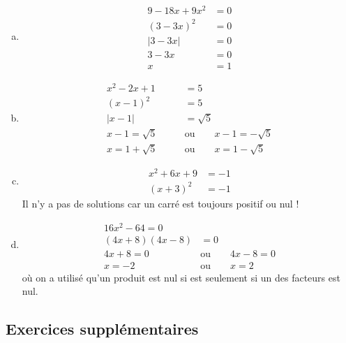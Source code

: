 {\begin{enumerate}[a)]
			\item
			\begin{align*}
				9 - 18x + 9x^2 &= 0 \\
				(3-3x)^2 &= 0 \\
				|3-3x| &= 0 \\
				3-3x &= 0 \\
				x&=1
			\end{align*}
			\item 
			\begin{align*}
				x^2 - 2x + 1 &= 5 \\
				(x-1)^2 &= 5 \\
				|x-1| &= \sqrt{5} \\
				x-1=\sqrt{5} \qquad & \text{ou} \qquad x-1=-\sqrt{5} \\
				x=1+\sqrt{5} \qquad & \text{ou} \qquad x=1-\sqrt{5}
			\end{align*}
			\item 
			\begin{align*}
				x^2 +6x + 9 &= -1 \\
				(x+3)^2 &= -1 
			\end{align*}
			Il n'y a pas de solutions car un carré est toujours positif ou nul !
			\item 
			\begin{align*}
				16x^2 - 64 = 0 \\
				(4x+8)(4x-8) &= 0 \\
				4x+8=0 \qquad & \text{ou} \qquad 4x-8=0 \\
				x=-2 \qquad & \text{ou} \qquad x=2
			\end{align*}
			où on a utilisé qu'un produit est nul si est seulement si un des facteurs est nul.
		\end{enumerate}
	
	
	}
	
	\ifdys
	\else
	\newpage
	\fi 
	
	\subsection*{Exercices supplémentaires}
	
